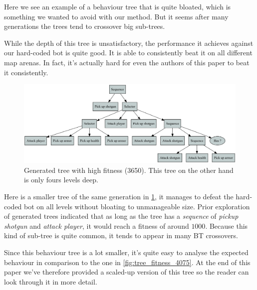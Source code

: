 \documentclass[a4paper, twocolumn]{article}
\begin{document}
        Here we see an example of a behaviour tree that is quite bloated, which is something we wanted to avoid with our method. But it seems after many generations the trees tend to crossover big sub-trees.

        While the depth of this tree is unsatisfactory, the performance it achieves against our hard-coded bot is quite good. It is able to consistently beat it on all different map arenas. In fact, it's actually hard for even the authors of this paper to beat it consistently.

        \begin{figure}[H]
            \centering
            \includegraphics[width=\linewidth]{share/tree-fitness-3780.png}
            \caption{Generated tree with high fitness (3650). This tree on the other hand is only fours levels deep.}
            \label{fig:tree_fitness_3650}
        \end{figure}
        Here is a smaller tree of the same generation in \cref{fig:tree_fitness_3650}, it manages to defeat the hard-coded bot on all levels without bloating to unmanageable size. Prior exploration of generated trees indicated that as long as the tree has a \textit{sequence} of \textit{pickup shotgun} and \textit{attack player}, it would reach a fitness of around \(1000\). Because this kind of sub-tree is quite common, it tends to appear in many BT crossovers.

        Since this behaviour tree is a lot smaller, it's quite easy to analyse the expected behaviour in comparison to the one in \cref{fig:tree_fitness_4075}. At the end of this paper we've therefore provided a scaled-up version of this tree so the reader can look through it in more detail.
\end{document}
